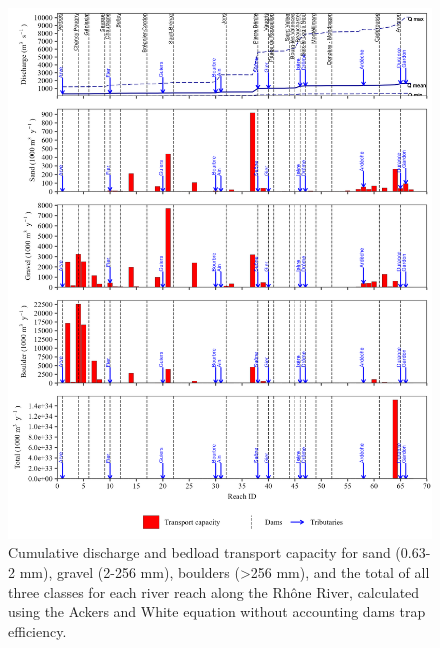 \documentclass[
]{book}
\begin{document}
\begin{figure}
\includegraphics[width=26.24in]{img/res_cascade/res_E0_eA&W_noDams/plots_tr_cap-silt/tr_cap_res_sum_hy_E0_eA&W_noDams} \caption{Cumulative discharge and bedload transport capacity for sand (0.63-2 mm), gravel (2-256 mm), boulders (>256 mm), and the total of all three classes for each river reach along the Rhône River, calculated using the Ackers and White equation without accounting dams trap efficiency.}\label{fig:TrcE0eA}
\end{figure}
\end{document}
